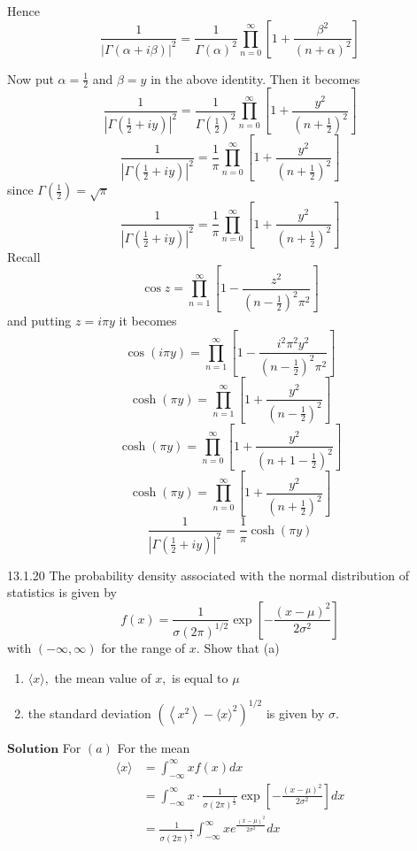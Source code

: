 Hence
$$
\frac{1}{|\Gamma(\alpha+i \beta)|^{2}}=\frac{1}{\Gamma(\alpha)^{2}} \prod_{n=0}^{\infty}\left[1+\frac{\beta^{2}}{(n+\alpha)^{2}}\right]
$$

Now put $\alpha=\frac{1}{2}$ and $\beta=y$ in the above identity. Then it becomes
$$
\frac{1}{\left|\Gamma\left(\frac{1}{2}+i y\right)\right|^{2}}=\frac{1}{\Gamma\left(\frac{1}{2}\right)^{2}} \prod_{n=0}^{\infty}\left[1+\frac{y^{2}}{\left(n+\frac{1}{2}\right)^{2}}\right]
$$
$$
\frac{1}{\left|\Gamma\left(\frac{1}{2}+i y\right)\right|^{2}}=\frac{1}{\pi} \prod_{n=0}^{\infty}\left[1+\frac{y^{2}}{\left(n+\frac{1}{2}\right)^{2}}\right]
$$
since $\Gamma\left(\frac{1}{2}\right)=\sqrt{\pi}$
$$
\frac{1}{\left|\Gamma\left(\frac{1}{2}+i y\right)\right|^{2}}=\frac{1}{\pi} \prod_{n=0}^{\infty}\left[1+\frac{y^{2}}{\left(n+\frac{1}{2}\right)^{2}}\right]
$$
Recall
$$
\cos z=\prod_{n=1}^{\infty}\left[1-\frac{z^{2}}{\left(n-\frac{1}{2}\right)^{2} \pi^{2}}\right]
$$
and putting $z=i \pi y$ it becomes
$$
\cos (i \pi y)=\prod_{n=1}^{\infty}\left[1-\frac{i^{2} \pi^{2} y^{2}}{\left(n-\frac{1}{2}\right)^{2} \pi^{2}}\right]
$$
$$
\cosh (\pi y)=\prod_{n=1}^{\infty}\left[1+\frac{y^{2}}{\left(n-\frac{1}{2}\right)^{2}}\right]
$$
$$
\cosh (\pi y)=\prod_{n=0}^{\infty}\left[1+\frac{y^{2}}{\left(n+1-\frac{1}{2}\right)^{2}}\right]
$$
$$
\cosh (\pi y)=\prod_{n=0}^{\infty}\left[1+\frac{y^{2}}{\left(n+\frac{1}{2}\right)^{2}}\right]
$$
$$
\frac{1}{\left|\Gamma\left(\frac{1}{2}+i y\right)\right|^{2}}=\frac{1}{\pi} \cosh (\pi y)
$$

\newpage

\begin{mybox}{13.1.20}
The probability density associated with the normal distribution of statistics is given by
$$
f(x)=\frac{1}{\sigma(2 \pi)^{1 / 2}} \exp \left[-\frac{(x-\mu)^{2}}{2 \sigma^{2}}\right]
$$
with $(-\infty, \infty)$ for the range of $x$. Show that
(a) 
\begin{enumerate}[$(a)$]
\item $\langle x\rangle,$ the mean value of $x,$ is equal to $\mu$
\item the standard deviation $\left(\left\langle x^{2}\right\rangle-\langle x\rangle^{2}\right)^{1 / 2}$ is given by $\sigma$.
\end{enumerate}

\end{mybox}

$\boxed{\textbf{Solution}}$ For $(a)$ For the mean
$$
\begin{aligned}
\langle x\rangle&=\int_{-\infty}^{\infty} x f(x) d x \\
&=\int_{-\infty}^{\infty} x \cdot \frac{1}{\sigma(2 \pi)^{\frac{1}{2}}} \exp \left[-\frac{(x-\mu)^{2}}{2 \sigma^{2}}\right] d x \\
&=\frac{1}{\sigma(2 \pi)^{\frac{1}{2}}} \int_{-\infty}^{\infty} x e^{\frac{(x-\mu)^{2}}{2 \sigma^{2}}} d x \\
\end{aligned}
$$

